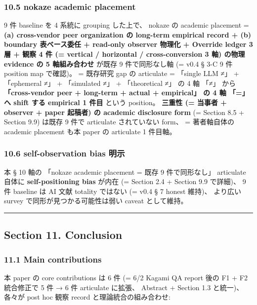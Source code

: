 \documentclass[
]{article}
\begin{document}
\subsubsection{10.5 nokaze academic
placement}\label{nokaze-academic-placement}

9 件 baseline を 4 系統に grouping した上で、 nokaze の academic
placement = \textbf{(a) cross-vendor peer organization の long-term
empirical record + (b) boundary 表ベース委任 + read-only observer 物理化
+ Override ledger 3 層 + 観察 4 件 (= vertical / horizontal /
cross-conversion 3 軸) の物理 evidence の 5 軸組み合わせ} が既存 9
件で同形なし軸 (= v0.4 § 3-C 9 件 position map で確認)。 = 既存研究 gap
の articulate = 「single LLM ≠」 + 「ephemeral ≠」 + 「simulated ≠」 +
「theoretical ≠」 の 4 軸 「≠」 から \textbf{「cross-vendor peer +
long-term + actual + empirical」 の 4 軸 「=」 へ shift する empirical 1
件目} という position。 \textbf{三重性 (= 当事者 + observer + paper
起稿者) の academic disclosure form} (= Section 8.5 + Section 9.9)
は既存 9 件で articulate されていない form、 = 著者軸自体の academic
placement も本 paper の articulate 1 件目軸。

\subsubsection{10.6 self-observation bias
明示}\label{self-observation-bias-ux660eux793a}

本 § 10 軸の 「nokaze academic placement = 既存 9 件で同形なし」
articulate 自体に \textbf{self-positioning bias} が内在 (= Section 2.4 +
Section 9.9 で詳細)、 9 件 baseline は AI 文献 totality ではない (= v0.4
§ 7 honest 維持)、 より広い survey で同形が見つかる可能性は弱い caveat
として維持。

\begin{center}\rule{0.5\linewidth}{0.5pt}\end{center}

\subsection{Section 11. Conclusion}\label{section-11.-conclusion}

\subsubsection{11.1 Main contributions}\label{main-contributions}

本 paper の core contributions は 6 件 (= 6/2 Kagami QA report 後の F1 +
F2 統合修正で 5 件 → 6 件 articulate に拡張、 Abstract + Section 1.3
と統一)、 各々が post hoc 観察 record と理論統合の組み合わせ:
\end{document}
